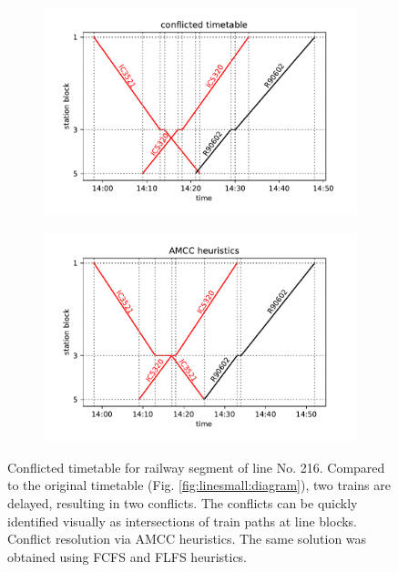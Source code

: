 \begin{figure}
  \begin{subfigure}[b]{0.5\columnwidth}
    \caption{}\label{conflict}
    \includegraphics[width=\textwidth]{figures/small_conflict}
  \end{subfigure}
  \begin{subfigure}[b]{0.5\columnwidth}
    \caption{}\label{resolution}
    \includegraphics[width=\textwidth]{figures/small_solution}
  \end{subfigure}
  \caption{
     Conflicted timetable for railway segment of line No. 216. Compared to the original timetable
    (Fig. \ref{fig:linesmall:diagram}), two trains are delayed, resulting in two conflicts. The conflicts
    can be quickly identified visually as intersections of train paths at line blocks.
     Conflict resolution via AMCC heuristics. The same solution was obtained using FCFS and FLFS heuristics.
  }
  \label{fig:smallconflict}
\end{figure}

